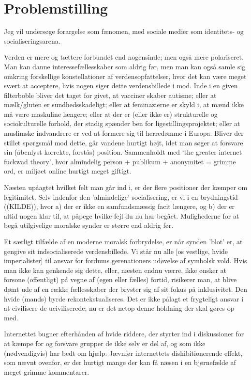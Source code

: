 \section{Problemstilling}

Jeg vil undersøge forargelse som fænomen, med sociale medier som
identitets- og socialiseringsarena.

Verden er mere og tættere forbundet end nogensinde; men også mere
polariseret. Man kan danne interessefællesskaber som aldrig før, men man
kan også samle sig omkring forskellige konstellationer af
verdensopfattelser, hvor det kan være meget svært at acceptere, hvis nogen
siger dette verdensbillede i mod. Inde i en given filterboble bliver det
taget for givet, at vacciner skaber autisme; eller at mælk/gluten er
sundhedsskadeligt; eller at feminazierne er skyld i, at mænd ikke må være
maskuline længere; eller at der er (eller ikke er) strukturelle og
sociokulturelle forhold, der stadig spænder ben for
ligestillingsprojektet; eller at muslimske indvandrere er ved at formere
sig til herredømme i Europa. Bliver der stillet spørgsmål mod dette, går
vandene hurtigt højt, idet man søger at forsvare sin (åbenlyst korrekte,
forstås) position. Sammenholdt med ‘the greater internet fuckwad theory’,
hvor almindelig person + publikum + anonymitet = grimme ord, er miljøet
online hurtigt meget giftigt.

Næsten upåagtet hvilket felt man går ind i, er der flere positioner der
kæmper om legitimitet. Selv indenfor den 'almindelige' socialisering, er
vi i en brydningstid ((KILDE)), hvor a) der er ikke en samfundsmæssig
facit længere, og b) der er altid nogen klar til, at påpege hvilke fejl du
nu har begået. Mulighederne for at begå utilgivelige moralske synder er
større end aldrig før. 

Et særligt tilfælde af en moderne moralsk forbrydelse, er når synden
'blot' er, at gengive sit indsocialiserede verdensbillede. Vi står nu alle
[os vestlige, hvide imperialister] til ansvar for fordums gerenationers
udøvelse af symbolsk vold. Hvis man ikke kan genkende sig dette, eller,
næsten endnu værre, ikke ønsker at forsone (offentligt) på vegne af (egen
eller fælles) fortid, risikerer man, at blive dømt ude af en række
fællesskaber der bryster sig af sit fokus på inklusivitet. Den hvide
(mands) byrde rekontekstualiseres. Det er ikke pålagt et frygteligt ansvar
i at civilisere de uciviliserede; nu er det netop denne holdning der skal
gøres op med.

Internettet bugner efterhånden af hvide riddere, der styrter ind
i diskussioner for at kæmpe for og forsvare grupper de ikke selv er del
af, og som ikke (nødvendigvis) har bedt om hjælp. Jævnfør internettets
dishibitionerende effekt, som nævnt ovenfor, er der hurtigt mange der kan
få næsen i en bjørnefælde af meget grimme kommentarer.
